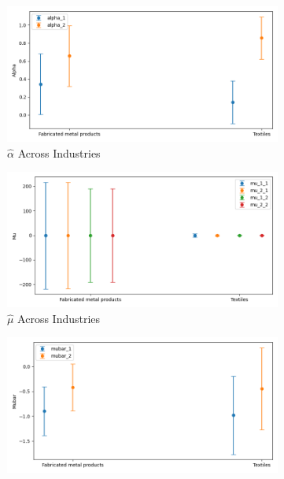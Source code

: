\documentclass{article}
\begin{document}
\begin{figure}[ht!]
    \centering 
    \caption{AR(1) Mixture Model with $\log K$, Import and CIIU Across Industries}
    \begin{subfigure}[t]{0.32\textwidth}
        \centering
        \includegraphics[width=\textwidth]{figure/ar1_mixture_kmshare_ciiu_alpha_across_industries.png}
        \caption{$\hat\alpha$ Across Industries}
    \end{subfigure}
    \begin{subfigure}[t]{0.32\textwidth}
        \centering
        \includegraphics[width=\textwidth]{figure/ar1_mixture_kmshare_ciiu_mu_across_industries.png}
        \caption{$\hat\mu$ Across Industries}
    \end{subfigure}
    \begin{subfigure}[t]{0.32\textwidth}
        \centering
        \includegraphics[width=\textwidth]{figure/ar1_mixture_kmshare_ciiu_mubar_across_industries.png}

\end{subfigure}
\end{figure}
\end{document}
